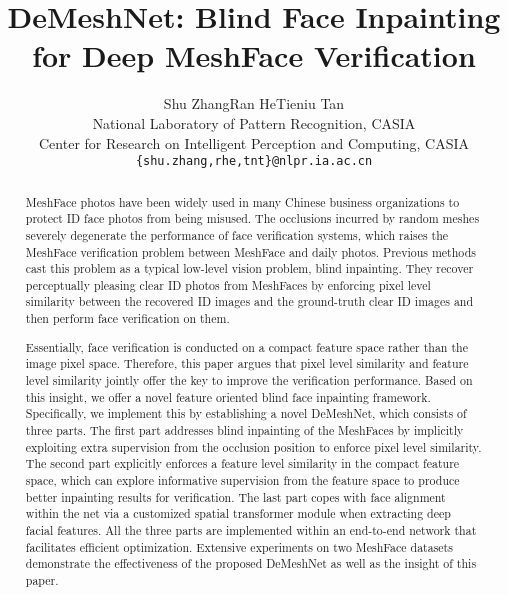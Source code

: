 \documentclass[10pt,twocolumn,letterpaper]{article}
\begin{document}
\title{DeMeshNet: Blind Face Inpainting for Deep MeshFace Verification}

\author{Shu Zhang\quad Ran He\quad Tieniu Tan\\
National Laboratory of Pattern Recognition, CASIA\\
Center for Research on Intelligent Perception and Computing, CASIA\\
{\tt\small \{shu.zhang,rhe,tnt\}@nlpr.ia.ac.cn}
}

\maketitle

\begin{abstract}
MeshFace photos have been widely used in many Chinese business organizations to protect ID face photos from being misused. The occlusions incurred by random meshes severely degenerate the performance of face verification systems, which raises the MeshFace verification problem between MeshFace and daily photos. Previous methods cast this problem as a typical low-level vision problem, \ie blind inpainting. They recover perceptually pleasing clear ID photos from MeshFaces by enforcing pixel level similarity between the recovered ID images and the ground-truth clear ID images and then perform face verification on them.

Essentially, face verification is conducted on a compact feature space rather than the image pixel space. Therefore, this paper argues that pixel level similarity and feature level similarity jointly offer the key to improve the verification performance. Based on this insight, we offer a novel feature oriented blind face inpainting framework. Specifically, we implement this by establishing a novel DeMeshNet, which consists of three parts. The first part addresses blind inpainting of the MeshFaces by implicitly exploiting extra supervision from the occlusion position to enforce pixel level similarity. The second part explicitly enforces a feature level similarity in the compact feature space, which can explore informative supervision from the feature space to produce better inpainting results for verification. The last part copes with face alignment within the net via a customized spatial transformer module when extracting deep facial features. All the three parts are implemented within an end-to-end network that facilitates efficient optimization. Extensive experiments on two MeshFace datasets demonstrate the effectiveness of the proposed DeMeshNet as well as the insight of this paper.
\end{abstract}
\end{document}
